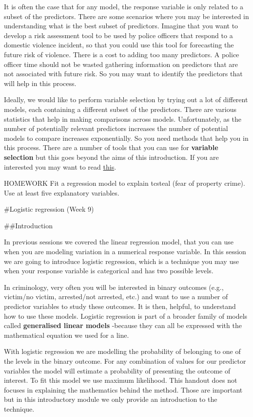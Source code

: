 \documentclass[]{book}
\theoremstyle{definition}
\theoremstyle{definition}
\theoremstyle{definition}
\theoremstyle{remark}
\begin{document}
It is often the case that for any model, the response variable is only
related to a subset of the predictors. There are some scenarios where
you may be interested in understanding what is the best subset of
predictors. Imagine that you want to develop a risk assessment tool to
be used by police officers that respond to a domestic violence incident,
so that you could use this tool for forecasting the future risk of
violence. There is a cost to adding too many predictors. A police
officer time should not be wasted gathering information on predictors
that are not associated with future risk. So you may want to identify
the predictors that will help in this process.

Ideally, we would like to perform variable selection by trying out a lot
of different models, each containing a different subset of the
predictors. There are various statistics that help in making comparisons
across models. Unfortunately, as the number of potentially relevant
predictors increases the number of potential models to compare increases
exponentially. So you need methods that help you in this process. There
are a number of tools that you can use for \textbf{variable selection}
but this goes beyond the aims of this introduction. If you are
interested you may want to read
\href{http://link.springer.com/chapter/10.1007/978-1-4614-7138-7_6}{this}.

HOMEWORK Fit a regression model to explain tcsteal (fear of property
crime). Use at least five explanatory variables.

\#Logistic regression (Week 9)

\#\#Introduction

In previous sessions we covered the linear regression model, that you
can use when you are modeling variation in a numerical response
variable. In this session we are going to introduce logistic regression,
which is a technique you may use when your response variable is
categorical and has two possible levels.

In criminology, very often you will be interested in binary outcomes
(e.g., victim/no victim, arrested/not arrested, etc.) and want to use a
number of predictor variables to study these outcomes. It is then,
helpful, to understand how to use these models. Logistic regression is
part of a broader family of models called \textbf{generalised linear
models} -because they can all be expressed with the mathematical
equation we used for a line.

With logistic regression we are modelling the probability of belonging
to one of the levels in the binary outcome. For any combination of
values for our predictor variables the model will estimate a probability
of presenting the outcome of interest. To fit this model we use maximum
likelihood. This handout does not focuses in explaining the mathematics
behind the method. Those are important but in this introductory module
we only provide an introduction to the technique.
\end{document}
